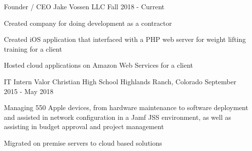 \begin{cventries}
    \cventry
    {Founder / CEO}
    { Jake Vossen LLC }
    {}
    {Fall 2018 - Current}
    {
      \begin{cvitems}
        \item {Created company for doing development as a contractor}
        \item {Created iOS application that interfaced with a PHP web server for weight lifting training for a client}
        \item {Hosted cloud applications on Amazon Web Services for a client}
      \end{cvitems}
    }
    

  \cventry
    {IT Intern}
    {Valor Christian High School }
    {Highlands Ranch, Colorado} %
    {September 2015 - May 2018} %
    {
      \begin{cvitems} %
        \item {Managing 550 Apple devices, from hardware maintenance
            to software deployment and assisted in network
            configuration in a Jamf JSS environment, as well as
            assisting in budget approval and project management}
        \item {Migrated on premise servers to cloud based solutions}
      \end{cvitems}
    }
    \fi
\end{cventries}
